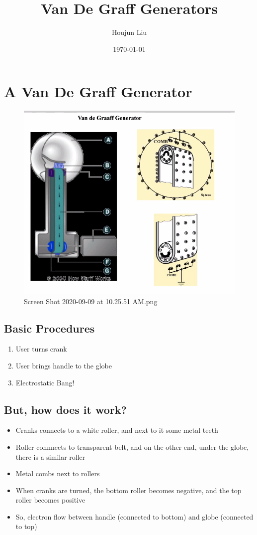 \documentclass[letterpaper]{article}
\author{Houjun Liu}
\date{\today}
\title{Van De Graff Generators}
\renewcommand{\tableofcontents}{}
\begin{document}
\tableofcontents



\section{A Van De Graff Generator}
\label{sec:orge2078d4}
\begin{figure}[htbp]
\centering
\includegraphics[width=.9\linewidth]{./Screen Shot 2020-09-09 at 10.25.51 AM.png}
\caption{Screen Shot 2020-09-09 at 10.25.51 AM.png}
\end{figure}

\subsection{Basic Procedures}
\label{sec:org6d01483}
\begin{enumerate}
\item User turns crank
\item User brings handle to the globe
\item Electrostatic Bang!
\end{enumerate}

\subsection{But, how does it work?}
\label{sec:org8e912cf}
\begin{itemize}
\item Cranks connects to a white roller, and next to it some metal teeth
\item Roller connnects to transparent belt, and on the other end, under the
globe, there is a similar roller
\item Metal combs next to rollers
\item When cranks are turned, the bottom roller becomes negative, and the
top roller becomes positive
\item So, electron flow between handle (connected to bottom) and globe
(connected to top)
\end{itemize}
\end{document}
